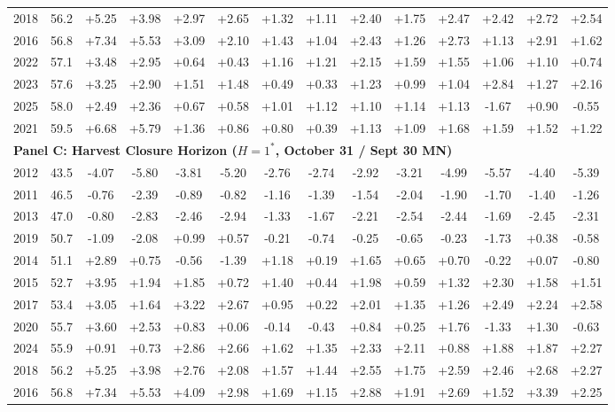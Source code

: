 \begin{table}[htbp]
\begin{tabular*}{\textwidth}{@{\extracolsep{\fill}} c c cc cc cc cc cc cc @{}}
2018 & 56.2 & +5.25 & +3.98 & +2.97 & +2.65 & +1.32 & +1.11 & +2.40 & +1.75 & +2.47 & +2.42 & +2.72 & +2.54 \\
2016 & 56.8 & +7.34 & +5.53 & +3.09 & +2.10 & +1.43 & +1.04 & +2.43 & +1.26 & +2.73 & +1.13 & +2.91 & +1.62 \\
2022 & 57.1 & +3.48 & +2.95 & +0.64 & +0.43 & +1.16 & +1.21 & +2.15 & +1.59 & +1.55 & +1.06 & +1.10 & +0.74 \\
2023 & 57.6 & +3.25 & +2.90 & +1.51 & +1.48 & +0.49 & +0.33 & +1.23 & +0.99 & +1.04 & +2.84 & +1.27 & +2.16 \\
2025 & 58.0 & +2.49 & +2.36 & +0.67 & +0.58 & +1.01 & +1.12 & +1.10 & +1.14 & +1.13 & -1.67 & +0.90 & -0.55 \\
2021 & 59.5 & +6.68 & +5.79 & +1.36 & +0.86 & +0.80 & +0.39 & +1.13 & +1.09 & +1.68 & +1.59 & +1.52 & +1.22 \\
\midrule
\multicolumn{14}{l}{\textbf{Panel C: Harvest Closure Horizon ($H=1^*$, October 31 / Sept 30 MN)}} \\
2012 & 43.5 & -4.07 & -5.80 & -3.81 & -5.20 & -2.76 & -2.74 & -2.92 & -3.21 & -4.99 & -5.57 & -4.40 & -5.39 \\
2011 & 46.5 & -0.76 & -2.39 & -0.89 & -0.82 & -1.16 & -1.39 & -1.54 & -2.04 & -1.90 & -1.70 & -1.40 & -1.26 \\
2013 & 47.0 & -0.80 & -2.83 & -2.46 & -2.94 & -1.33 & -1.67 & -2.21 & -2.54 & -2.44 & -1.69 & -2.45 & -2.31 \\
2019 & 50.7 & -1.09 & -2.08 & +0.99 & +0.57 & -0.21 & -0.74 & -0.25 & -0.65 & -0.23 & -1.73 & +0.38 & -0.58 \\
2014 & 51.1 & +2.89 & +0.75 & -0.56 & -1.39 & +1.18 & +0.19 & +1.65 & +0.65 & +0.70 & -0.22 & +0.07 & -0.80 \\
2015 & 52.7 & +3.95 & +1.94 & +1.85 & +0.72 & +1.40 & +0.44 & +1.98 & +0.59 & +1.32 & +2.30 & +1.58 & +1.51 \\
2017 & 53.4 & +3.05 & +1.64 & +3.22 & +2.67 & +0.95 & +0.22 & +2.01 & +1.35 & +1.26 & +2.49 & +2.24 & +2.58 \\
2020 & 55.7 & +3.60 & +2.53 & +0.83 & +0.06 & -0.14 & -0.43 & +0.84 & +0.25 & +1.76 & -1.33 & +1.30 & -0.63 \\
2024 & 55.9 & +0.91 & +0.73 & +2.86 & +2.66 & +1.62 & +1.35 & +2.33 & +2.11 & +0.88 & +1.88 & +1.87 & +2.27 \\
2018 & 56.2 & +5.25 & +3.98 & +2.76 & +2.08 & +1.57 & +1.44 & +2.55 & +1.75 & +2.59 & +2.46 & +2.68 & +2.27 \\
2016 & 56.8 & +7.34 & +5.53 & +4.09 & +2.98 & +1.69 & +1.15 & +2.88 & +1.91 & +2.69 & +1.52 & +3.39 & +2.25 \\

\end{tabular*}
\end{table}
